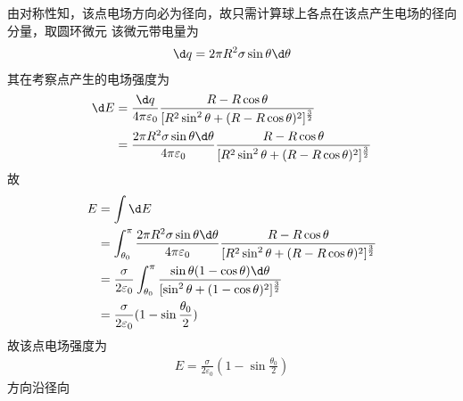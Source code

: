 \documentclass{phyasgn}
\begin{document}
\begin{sol}[4]
  由对称性知，该点电场方向必为径向，故只需计算球上各点在该点产生电场的径向分量，取圆环微元
  该微元带电量为
  \begin{align*}
    \d q=2\pi R^2\sigma\sin\theta\d\theta
  \end{align*}
  其在考察点产生的电场强度为
  \begin{align*}
    \d E&=\frac{\d q}{4\pi\varepsilon_0}\frac{R-R\cos\theta}{[R^2\sin^2\theta+(R-R\cos\theta)^2]^{\frac{3}{2}}}\\
    &=\frac{2\pi R^2\sigma\sin\theta\d\theta}{4\pi\varepsilon_0}\frac{R-R\cos\theta}{[R^2\sin^2\theta+(R-R\cos\theta)^2]^{\frac{3}{2}}}
  \end{align*}
  故
  \begin{align*}
    E&=\int \d E\\
    &=\int_{\theta_0}^{\pi}\frac{2\pi R^2\sigma\sin\theta\d\theta}{4\pi\varepsilon_0}\frac{R-R\cos\theta}{[R^2\sin^2\theta+(R-R\cos\theta)^2]^{\frac{3}{2}}}\\
    &=\frac{\sigma}{2\varepsilon_0}\int_{\theta_0}^{\pi}\frac{\sin\theta(1-\cos\theta)\d\theta}{[\sin^2\theta+(1-\cos\theta)^2]^{\frac{3}{2}}}\\
    &=\frac{\sigma}{2\varepsilon_0}(1-\sin\frac{\theta_0}{2})
  \end{align*}
  故该点电场强度为
  \begin{align*}
    E=\frac{\sigma}{2\varepsilon_0}(1-\sin\frac{\theta_0}{2})
  \end{align*}
  方向沿径向
\end{sol}\par
\end{document}
